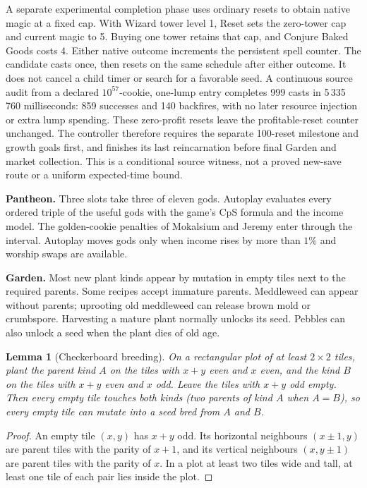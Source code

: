 \documentclass[11pt,a4paper]{article}
\numberwithin{equation}{section}
\newtheorem{lemma}[theorem]{Lemma}
\theoremstyle{definition}
\theoremstyle{remark}
\newcommand{\proofstep}[1]{\par\addvspace{\medskipamount}\noindent\textbf{#1}\enspace\ignorespaces}
\begin{document}
A separate experimental completion phase uses ordinary resets to obtain native magic at a fixed cap. With Wizard tower level 1, Reset sets the zero-tower cap and current magic to 5. Buying one tower retains that cap, and Conjure Baked Goods costs 4. Either native outcome increments the persistent spell counter. The candidate casts once, then resets on the same schedule after either outcome. It does not cancel a child timer or search for a favorable seed. A continuous source audit from a declared $10^{57}$-cookie, one-lump entry completes 999 casts in 5\,335\,760 milliseconds: 859 successes and 140 backfires, with no later resource injection or extra lump spending. These zero-profit resets leave the profitable-reset counter unchanged. The controller therefore requires the separate 100-reset milestone and growth goals first, and finishes its last reincarnation before final Garden and market collection. This is a conditional source witness, not a proved new-save route or a uniform expected-time bound.

\proofstep{Pantheon.} Three slots take three of eleven gods. Autoplay evaluates every ordered triple of the useful gods with the game's CpS formula and the income model. The golden-cookie penalties of Mokalsium and Jeremy enter through the interval. Autoplay moves gods only when income rises by more than $1\%$ and worship swaps are available.

\proofstep{Garden.} Most new plant kinds appear by mutation in empty tiles next to the required parents. Some recipes accept immature parents. Meddleweed can appear without parents; uprooting old meddleweed can release brown mold or crumbspore. Harvesting a mature plant normally unlocks its seed. Pebbles can also unlock a seed when the plant dies of old age.

\begin{lemma}[Checkerboard breeding]\label{lem:checkerboard}
On a rectangular plot of at least $2\times2$ tiles, plant the parent kind $A$ on the tiles with $x+y$ even and $x$ even, and the kind $B$ on the tiles with $x+y$ even and $x$ odd. Leave the tiles with $x+y$ odd empty. Then every empty tile touches both kinds (two parents of kind $A$ when $A=B$), so every empty tile can mutate into a seed bred from $A$ and $B$.
\end{lemma}

\begin{proof}
An empty tile $(x,y)$ has $x+y$ odd. Its horizontal neighbours $(x\pm1,y)$ are parent tiles with the parity of $x+1$, and its vertical neighbours $(x,y\pm1)$ are parent tiles with the parity of $x$. In a plot at least two tiles wide and tall, at least one tile of each pair lies inside the plot.
\end{proof}
\end{document}
